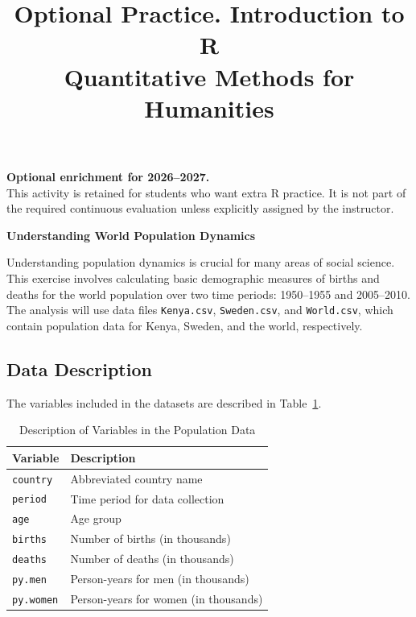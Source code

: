 \documentclass[12pt]{article}
\author{\empty}
\title{Optional Practice. Introduction to R \\ Quantitative Methods for Humanities}
\date{\empty}
\begin{document}
\maketitle

\begin{center}
    \textbf{Optional enrichment for 2026--2027.}\\
    This activity is retained for students who want extra R practice. It is not part of the required continuous evaluation unless explicitly assigned by the instructor.
\end{center}
\vspace{0.3cm}

\begin{center}
    \textbf{\large Understanding World Population Dynamics}    
\end{center}

Understanding population dynamics is crucial for many areas of social science. This exercise involves calculating basic demographic measures of births and deaths for the world population over two time periods: 1950--1955 and 2005--2010. The analysis will use data files \texttt{Kenya.csv}, \texttt{Sweden.csv}, and \texttt{World.csv}, which contain population data for Kenya, Sweden, and the world, respectively.

\subsection*{Data Description}

The variables included in the datasets are described in Table~\ref{tab:world-pop-data}.

\begin{table}[h]
\centering
\caption{Description of Variables in the Population Data}\label{tab:world-pop-data}
\begin{tabular}{ll}
\toprule
\textbf{Variable} & \textbf{Description} \\
\midrule
\texttt{country} & Abbreviated country name \\
\texttt{period} & Time period for data collection \\
\texttt{age} & Age group \\
\texttt{births} & Number of births (in thousands) \\
\texttt{deaths} & Number of deaths (in thousands) \\
\texttt{py.men} & Person-years for men (in thousands) \\
\texttt{py.women} & Person-years for women (in thousands) \\
\bottomrule
\end{tabular}
\end{table}
\end{document}
